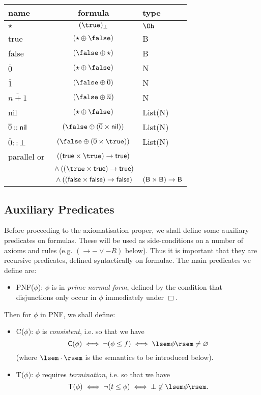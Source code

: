 \begin{center}
\begin{tabular}{|l|c|l|}  \hline
name & formula & type \\ \hline
$\star$ & $(\true )_{\bot}$ & $\Oh$ \\
{\sf true} & $(\star \oplus \false )$ & {\sf B} \\
{\sf false} & $(\false \oplus \star )$ & {\sf B} \\
$\overline{0}$ & $(\star \oplus \false )$ & {\sf N} \\
$\overline{1}$ & $(\false \oplus \overline{0})$ & {\sf N} \\
$\overline{n+1}$ & $(\false \oplus \overline{n})$  & {\sf N} \\
{\sf nil} & $(\star \oplus \false )$ & {\sf List(N)} \\
$\overline{0} :: {\sf nil}$ & $(\false \oplus (\overline{0} \times {\sf nil}))$ & {\sf List(N)} \\
$\overline{0} :: \bot$ & $(\false \oplus (\overline{0} \times \true ))$ & {\sf List(N)} \\
{\sf parallel or} & $(({\sf true} \times \true ) \rightarrow {\sf true})$ & \\
& $\mbox{} \wedge ((\true \times {\sf true}) \rightarrow {\sf true})$ & \\
& $\mbox{} \wedge (({\sf false} \times {\sf false}) \rightarrow {\sf false})$ 
& $({\sf B} \times {\sf B}) \rightarrow {\sf B}$ \\ \hline
\end{tabular}
\end{center}
\subsection*{Auxiliary Predicates}
Before proceeding to the axiomatisation proper, we shall define some
auxiliary predicates on formulas. These will be used as side-conditions
on a number of axioms and rules (e.g. $(\rightarrow - \vee - R)$ below).
Thus it is important that they are recursive predicates, defined
syntactically on formulae. The main predicates we define are:
\begin{itemize}
\item {\sf PNF}($\phi$): $\phi$ is in {\em prime normal form},
defined by the condition that disjunctions only occur in $\phi$
immediately under $\Box$.
\end{itemize}
Then for $\phi$ in PNF, we shall define:
\begin{itemize}
\item {\sf C}($\phi$): $\phi$ is {\em consistent}, i.e. so that we have
\[ {\sf C}(\phi ) \; \Longleftrightarrow \; \neg (\phi \leq {\sl f})
\; \Longleftrightarrow \; \lsem \phi \rsem \neq \varnothing \]
(where $\lsem \cdot \rsem$ is the semantics to be introduced below).
\item {\sf T}($\phi$): $\phi$ requires {\em termination}, i.e. so that we have
\[ {\sf T}(\phi ) \; \Longleftrightarrow \; \neg ({\sl t} \leq \phi )
\; \Longleftrightarrow \; \bot \not\in \lsem \phi \rsem . \] 
\end{itemize}

